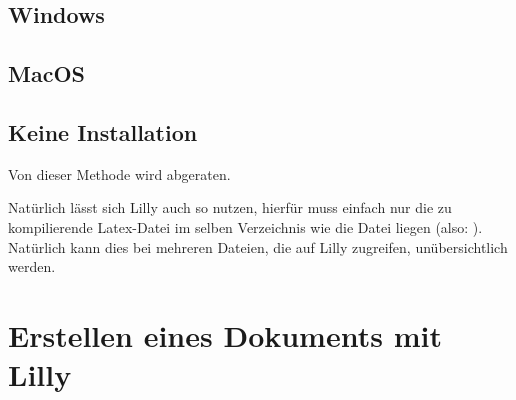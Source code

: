 \subsection{Windows  }
\subsection{MacOS  }

\subsection{Keine Installation}
\begin{bemerkung}
    Von dieser Methode wird abgeraten.
\end{bemerkung}
Natürlich lässt sich Lilly auch so nutzen, hierfür muss einfach nur die zu kompilierende Latex-Datei im selben Verzeichnis wie die Datei  liegen (also: ). Natürlich kann dies bei mehreren Dateien, die auf Lilly zugreifen, unübersichtlich werden.
\clearpage
\section[Erstellen eines Dokuments mit Lilly]{Erstellen eines Dokuments mit Lilly \tiny{}}
